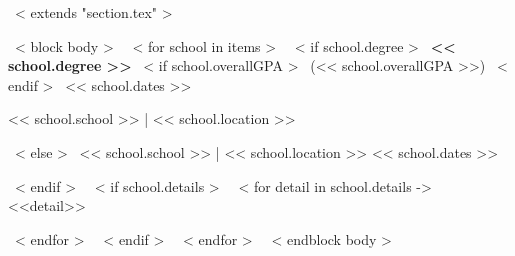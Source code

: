 ~< extends "section.tex" >~

~< block body >~
~< for school in items >~
  ~< if school.degree >~
    \textbf{<< school.degree >>}
    ~< if school.overallGPA >~
        (<< school.overallGPA >>)
    ~< endif >~
    \hfill << school.dates >> \par
    << school.school >> | << school.location >> \par
  ~< else >~
    << school.school >> | << school.location >> \hfill << school.dates >> \par
  ~< endif >~
  ~< if school.details >~
    ~< for detail in school.details ->~
        <<detail>> \par
    ~< endfor >~
  ~< endif >~
  \vspace{3mm}
~< endfor >~
\vspace{-3mm}
~< endblock body >~
